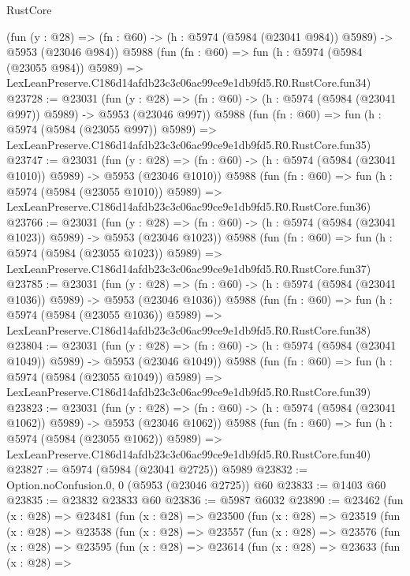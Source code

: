 \begin{lexlean}{RustCore}
\begin{coremodule}
    (fun (y : @28) => (fn : @60) -> (h : @5974 (@5984 (@23041 @984)) @5989) -> @5953 (@23046 @984))
    @5988
    (fun (fn : @60) =>
    fun (h : @5974 (@5984 (@23055 @984)) @5989) =>
    LexLeanPreserve.C186d14afdb23c3c06ac99ce9e1db9fd5.R0.RustCore.fun34)
@23728 := @23031
    (fun (y : @28) => (fn : @60) -> (h : @5974 (@5984 (@23041 @997)) @5989) -> @5953 (@23046 @997))
    @5988
    (fun (fn : @60) =>
    fun (h : @5974 (@5984 (@23055 @997)) @5989) =>
    LexLeanPreserve.C186d14afdb23c3c06ac99ce9e1db9fd5.R0.RustCore.fun35)
@23747 := @23031
    (fun (y : @28) =>
    (fn : @60) -> (h : @5974 (@5984 (@23041 @1010)) @5989) -> @5953 (@23046 @1010))
    @5988
    (fun (fn : @60) =>
    fun (h : @5974 (@5984 (@23055 @1010)) @5989) =>
    LexLeanPreserve.C186d14afdb23c3c06ac99ce9e1db9fd5.R0.RustCore.fun36)
@23766 := @23031
    (fun (y : @28) =>
    (fn : @60) -> (h : @5974 (@5984 (@23041 @1023)) @5989) -> @5953 (@23046 @1023))
    @5988
    (fun (fn : @60) =>
    fun (h : @5974 (@5984 (@23055 @1023)) @5989) =>
    LexLeanPreserve.C186d14afdb23c3c06ac99ce9e1db9fd5.R0.RustCore.fun37)
@23785 := @23031
    (fun (y : @28) =>
    (fn : @60) -> (h : @5974 (@5984 (@23041 @1036)) @5989) -> @5953 (@23046 @1036))
    @5988
    (fun (fn : @60) =>
    fun (h : @5974 (@5984 (@23055 @1036)) @5989) =>
    LexLeanPreserve.C186d14afdb23c3c06ac99ce9e1db9fd5.R0.RustCore.fun38)
@23804 := @23031
    (fun (y : @28) =>
    (fn : @60) -> (h : @5974 (@5984 (@23041 @1049)) @5989) -> @5953 (@23046 @1049))
    @5988
    (fun (fn : @60) =>
    fun (h : @5974 (@5984 (@23055 @1049)) @5989) =>
    LexLeanPreserve.C186d14afdb23c3c06ac99ce9e1db9fd5.R0.RustCore.fun39)
@23823 := @23031
    (fun (y : @28) =>
    (fn : @60) -> (h : @5974 (@5984 (@23041 @1062)) @5989) -> @5953 (@23046 @1062))
    @5988
    (fun (fn : @60) =>
    fun (h : @5974 (@5984 (@23055 @1062)) @5989) =>
    LexLeanPreserve.C186d14afdb23c3c06ac99ce9e1db9fd5.R0.RustCore.fun40)
@23827 := @5974 (@5984 (@23041 @2725)) @5989
@23832 := Option.noConfusion.{0, 0} (@5953 (@23046 @2725)) @60
@23833 := @1403 @60
@23835 := @23832 @23833 @60
@23836 := @5987 @6032
@23890 := @23462
    (fun (x : @28) =>
    @23481
      (fun (x : @28) =>
      @23500
        (fun (x : @28) =>
        @23519
          (fun (x : @28) =>
          @23538
            (fun (x : @28) =>
            @23557
              (fun (x : @28) =>
              @23576
                (fun (x : @28) =>
                @23595
                  (fun (x : @28) =>
                  @23614
                    (fun (x : @28) =>
                    @23633
                      (fun (x : @28) =>

\end{coremodule}
\end{lexlean}
